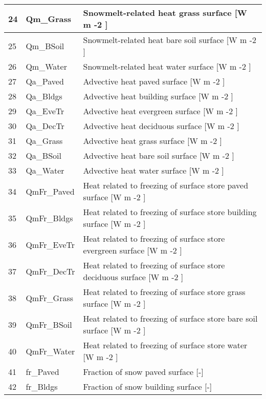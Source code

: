 \documentclass[letterpaper,10pt,english]{sphinxmanual}
\begin{document}
\begin{savenotes}
\begin{longtable}{|l|l|l|}
\\
\hline
24
&
Qm\_Grass
&
Snowmelt-related heat \textendash{} grass surface {[}W m -2 {]}
\\
\hline
25
&
Qm\_BSoil
&
Snowmelt-related heat \textendash{} bare soil surface {[}W m -2 {]}
\\
\hline
26
&
Qm\_Water
&
Snowmelt-related heat \textendash{} water surface {[}W m -2 {]}
\\
\hline
27
&
Qa\_Paved
&
Advective heat \textendash{} paved surface {[}W m -2 {]}
\\
\hline
28
&
Qa\_Bldgs
&
Advective heat \textendash{} building surface {[}W m -2 {]}
\\
\hline
29
&
Qa\_EveTr
&
Advective heat \textendash{} evergreen surface {[}W m -2 {]}
\\
\hline
30
&
Qa\_DecTr
&
Advective heat \textendash{} deciduous surface {[}W m -2 {]}
\\
\hline
31
&
Qa\_Grass
&
Advective heat \textendash{} grass surface {[}W m -2 {]}
\\
\hline
32
&
Qa\_BSoil
&
Advective heat \textendash{} bare soil surface {[}W m -2 {]}
\\
\hline
33
&
Qa\_Water
&
Advective heat \textendash{} water surface {[}W m -2 {]}
\\
\hline
34
&
QmFr\_Paved
&
Heat related to freezing of surface store \textendash{} paved surface {[}W m -2 {]}
\\
\hline
35
&
QmFr\_Bldgs
&
Heat related to freezing of surface store \textendash{} building surface {[}W m -2 {]}
\\
\hline
36
&
QmFr\_EveTr
&
Heat related to freezing of surface store \textendash{} evergreen surface {[}W m -2 {]}
\\
\hline
37
&
QmFr\_DecTr
&
Heat related to freezing of surface store \textendash{} deciduous surface {[}W m -2 {]}
\\
\hline
38
&
QmFr\_Grass
&
Heat related to freezing of surface store \textendash{} grass surface {[}W m -2 {]}
\\
\hline
39
&
QmFr\_BSoil
&
Heat related to freezing of surface store \textendash{} bare soil surface {[}W m -2 {]}
\\
\hline
40
&
QmFr\_Water
&
Heat related to freezing of surface store \textendash{} water {[}W m -2 {]}
\\
\hline
41
&
fr\_Paved
&
Fraction of snow \textendash{} paved surface {[}-{]}
\\
\hline
42
&
fr\_Bldgs
&
Fraction of snow \textendash{} building surface {[}-{]}

\end{longtable}
\end{savenotes}
\end{document}
